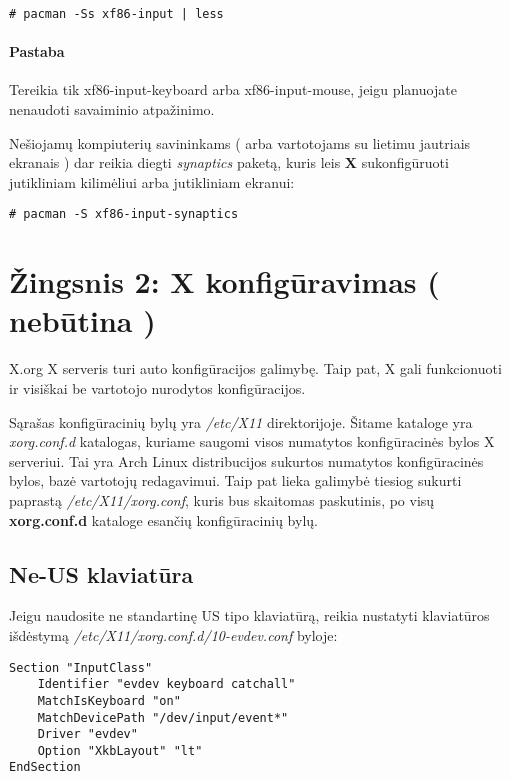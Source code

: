       \begin{verbatim}
# pacman -Ss xf86-input | less
      \end{verbatim}

      \paragraph{Pastaba} Tereikia tik xf86-input-keyboard arba
      xf86-input-mouse, jeigu planuojate nenaudoti savaiminio
      atpažinimo.

      Nešiojamų kompiuterių savininkams ( arba vartotojams su lietimu
      jautriais ekranais ) dar reikia diegti \textsl{synaptics}
      paketą, kuris leis \textbf{X} sukonfigūruoti jutikliniam
      kilimėliui arba jutikliniam ekranui:

      \begin{verbatim}
# pacman -S xf86-input-synaptics
      \end{verbatim}

  \section{Žingsnis 2: X konfigūravimas ( nebūtina )}

    X.org X serveris turi auto konfigūracijos galimybę. Taip pat, X
    gali funkcionuoti ir visiškai be vartotojo nurodytos
    konfigūracijos.

    Sąrašas konfigūracinių bylų yra \textsl{/etc/X11}
    direktorijoje. Šitame kataloge yra \textsl{xorg.conf.d} katalogas,
    kuriame saugomi visos numatytos konfigūracinės bylos X
    serveriui. Tai yra Arch Linux distribucijos sukurtos numatytos
    konfigūracinės bylos, bazė vartotojų redagavimui. Taip pat lieka
    galimybė tiesiog sukurti paprastą \textsl{/etc/X11/xorg.conf},
    kuris bus skaitomas paskutinis, po visų \textbf{xorg.conf.d}
    kataloge esančių konfigūracinių bylų.

    \subsection{Ne-US klaviatūra}


      Jeigu naudosite ne standartinę US tipo klaviatūrą, reikia
      nustatyti klaviatūros išdėstymą
      \textsl{/etc/X11/xorg.conf.d/10-evdev.conf} byloje:

      \begin{verbatim}
Section "InputClass"
    Identifier "evdev keyboard catchall"
    MatchIsKeyboard "on"
    MatchDevicePath "/dev/input/event*"
    Driver "evdev"
    Option "XkbLayout" "lt"
EndSection
      \end{verbatim}

